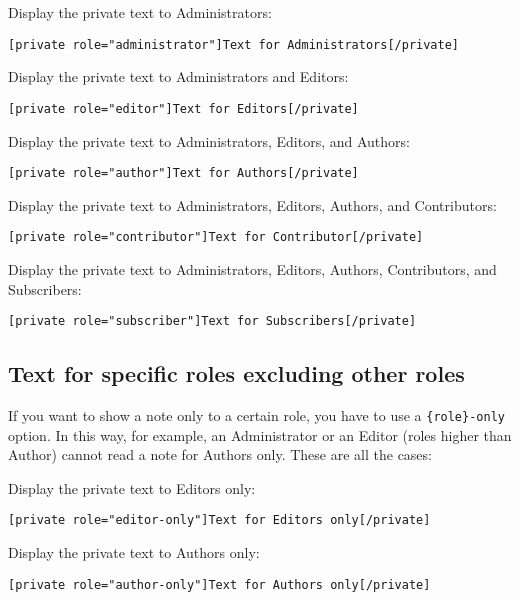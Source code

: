 Display the private text to Administrators:

\begin{lstlisting}
[private role="administrator"]Text for Administrators[/private]
\end{lstlisting}

Display the private text to Administrators and Editors:

\begin{lstlisting}
[private role="editor"]Text for Editors[/private]
\end{lstlisting}

Display the private text to Administrators, Editors, and Authors:

\begin{lstlisting}
[private role="author"]Text for Authors[/private]
\end{lstlisting}

Display the private text to Administrators, Editors, Authors, and Contributors:

\begin{lstlisting}
[private role="contributor"]Text for Contributor[/private]
\end{lstlisting}

Display the private text to Administrators, Editors, Authors, Contributors, and
Subscribers:

\begin{lstlisting}
[private role="subscriber"]Text for Subscribers[/private]
\end{lstlisting}

\subsection{Text for specific roles excluding other roles}

If you want to show a note only to a certain role, you have to use a
\verb+{role}-only+ option. In this way, for example, an Administrator or an
Editor (roles higher than Author) cannot read a note for Authors only. These are
all the cases:

Display the private text to Editors only:

\begin{lstlisting}
[private role="editor-only"]Text for Editors only[/private]
\end{lstlisting}

Display the private text to Authors only:

\begin{lstlisting}
[private role="author-only"]Text for Authors only[/private]
\end{lstlisting}

